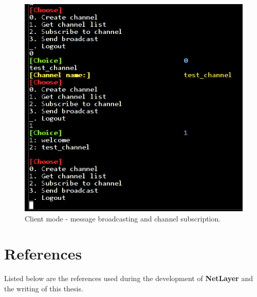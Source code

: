 \documentclass[11pt]{report}
\newcommand{\+}{\discretionary{\mbox{\scriptsize$\hookleftarrow$}}{}{}}
\renewcommand\emph{\textbf}
\begin{document}
            \begin{figure}[!htb]
            \caption{Client mode - message broadcasting and channel subscription.}
            \centering
            \includegraphics[width=1\textwidth]{screens/3.png}
            \end{figure}



\part{References}
    Listed below are the references used during the development of \emph{NetLayer} and the writing of this thesis.
\end{document}
